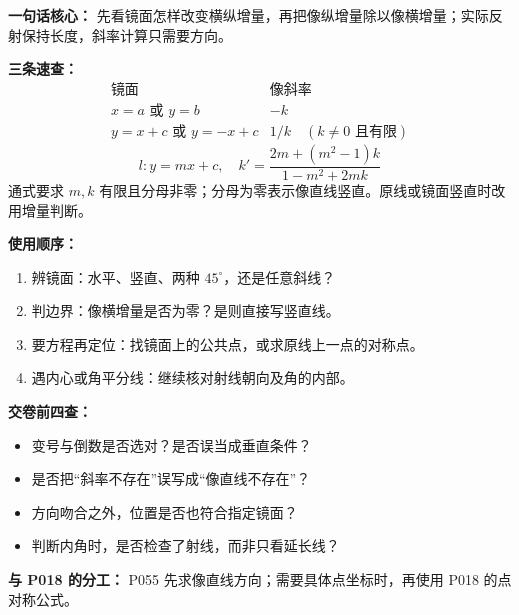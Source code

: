 \clearpage
\begin{summarybox}
\textbf{一句话核心：} 先看镜面怎样改变横纵增量，再把像纵增量除以像横增量；实际反射保持长度，斜率计算只需要方向。

\medskip
\textbf{三条速查：}
\[
\boxed{\begin{array}{c|c}
\text{镜面}&\text{像斜率}\\ \hline
x=a\text{ 或 }y=b&-k\\
y=x+c\text{ 或 }y=-x+c&1/k\quad(k\ne0\text{ 且有限})
\end{array}}
\]
\[
\boxed{l:y=mx+c,\quad
k'=\frac{2m+(m^2-1)k}{1-m^2+2mk}}
\]
通式要求 $m,k$ 有限且分母非零；分母为零表示像直线竖直。原线或镜面竖直时改用增量判断。

\medskip
\textbf{使用顺序：}
\begin{enumerate}[leftmargin=*]
\item 辨镜面：水平、竖直、两种 $45^\circ$，还是任意斜线？
\item 判边界：像横增量是否为零？是则直接写竖直线。
\item 要方程再定位：找镜面上的公共点，或求原线上一点的对称点。
\item 遇内心或角平分线：继续核对射线朝向及角的内部。
\end{enumerate}

\medskip
\textbf{交卷前四查：}
\begin{itemize}[leftmargin=*]
\item 变号与倒数是否选对？是否误当成垂直条件？
\item 是否把“斜率不存在”误写成“像直线不存在”？
\item 方向吻合之外，位置是否也符合指定镜面？
\item 判断内角时，是否检查了射线，而非只看延长线？
\end{itemize}

\textbf{与 P018 的分工：} P055 先求像直线方向；需要具体点坐标时，再使用 P018 的点对称公式。
\end{summarybox}
